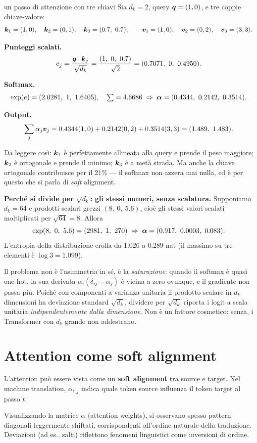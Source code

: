 \begin{esempiosvolto}{un passo di attenzione con tre chiavi}
Sia $d_k = 2$, query $\bm{q} = (1, 0)$, e tre coppie chiave-valore:
\[
\bm{k}_1 = (1, 0), \quad \bm{k}_2 = (0, 1), \quad \bm{k}_3 = (0.7,\ 0.7),
\qquad
\bm{v}_1 = (1, 0), \quad \bm{v}_2 = (0, 2), \quad \bm{v}_3 = (3, 3).
\]

\medskip
\textbf{Punteggi scalati.}
\[
e_j = \frac{\vect{q} \cdot \vect{k}_j}{\sqrt{d_k}} = \frac{(1,\ 0,\ 0.7)}{\sqrt 2} = (0.7071,\ 0,\ 0.4950).
\]

\textbf{Softmax.}
\[
\exp(e) = (2.0281,\ 1,\ 1.6405), \quad \textstyle\sum = 4.6686
\;\Rightarrow\;
\bm{\alpha} = (0.4344,\ 0.2142,\ 0.3514).
\]

\textbf{Output.}
\[
\sum_j \alpha_j \vect{v}_j = 0.4344(1,0) + 0.2142(0,2) + 0.3514(3,3) = (1.489,\ 1.483).
\]

Da leggere così: $\bm{k}_1$ è perfettamente allineata alla query e prende il peso maggiore; $\bm{k}_2$ è ortogonale e prende il minimo; $\bm{k}_3$ è a metà strada. Ma anche la chiave ortogonale contribuisce per il $21\%$ — il softmax non azzera mai nulla, ed è per questo che si parla di \emph{soft} alignment.

\medskip
\textbf{Perché si divide per $\sqrt{d_k}$: gli stessi numeri, senza scalatura.} Supponiamo $d_k = 64$ e prodotti scalari grezzi $(8,\ 0,\ 5.6)$, cioè gli stessi valori scalati moltiplicati per $\sqrt{64} = 8$. Allora
\[
\exp(8,\ 0,\ 5.6) = (2981,\ 1,\ 270) \;\Rightarrow\; \bm{\alpha} = (0.917,\ 0.0003,\ 0.083).
\]
L'entropia della distribuzione crolla da $1.026$ a $0.289$ nat (il massimo su tre elementi è $\log 3 = 1.099$).

Il problema non è l'asimmetria in sé, è la \emph{saturazione}: quando il softmax è quasi one-hot, la sua derivata $\alpha_i(\delta_{ij} - \alpha_j)$ è vicina a zero ovunque, e il gradiente non passa più. Poiché con componenti a varianza unitaria il prodotto scalare in $d_k$ dimensioni ha deviazione standard $\sqrt{d_k}$, dividere per $\sqrt{d_k}$ riporta i logit a scala unitaria \emph{indipendentemente dalla dimensione}. Non è un fattore cosmetico: senza, i Transformer con $d_k$ grande non addestrano.
\end{esempiosvolto}

\section{Attention come soft alignment}

\begin{tcolorbox}[title=Interpretazione]
L'attention può essere vista come un \textbf{soft alignment} tra source e target. Nel machine translation, $\alpha_{t,j}$ indica quale token source influenza il token target al passo $t$.

Visualizzando la matrice $\alpha$ (attention weights), si osservano spesso pattern diagonali leggermente shiftati, corrispondenti all'ordine naturale della traduzione. Deviazioni (ad es., salti) riflettono fenomeni linguistici come inversioni di ordine.
\end{tcolorbox}

